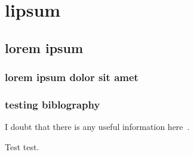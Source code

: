 \documentclass[a4paper,emptystyle]{bsuir-std}
\begin{document}





\section{lipsum}
\subsection{lorem ipsum}
\subsubsection{lorem ipsum dolor sit amet}
\lipsum[1]
\subsubsection{testing biblography}

I doubt that there is any useful information here~\cite{wikibook}.

Test test.
\end{document}
